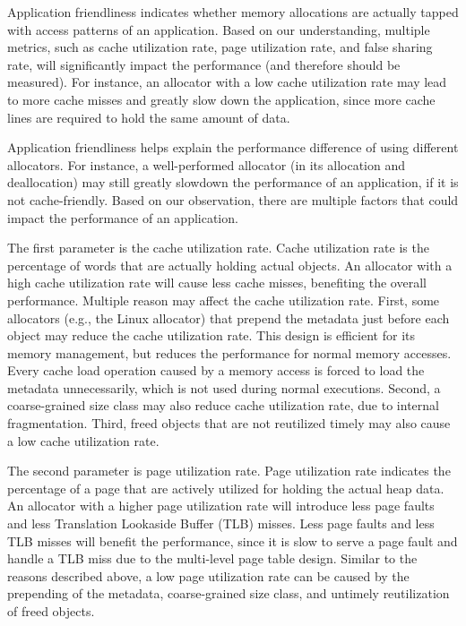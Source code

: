 Application friendliness indicates whether memory allocations are actually tapped with access patterns of an application. Based on our understanding, multiple metrics, such as cache utilization rate, page utilization rate, and false sharing rate, will significantly impact the performance (and therefore should be measured). For instance, an allocator with a low cache utilization rate may lead to more cache misses and greatly slow down the application, since more cache lines are required to hold the same amount of data. 

Application friendliness helps explain the performance difference of using different allocators. For instance, a well-performed allocator (in its allocation and deallocation) may still greatly slowdown the performance of an application, if it is not cache-friendly. Based on our observation, there are multiple factors that could impact the performance of an application.

The first parameter is the cache utilization rate. Cache utilization rate is the percentage of words that are actually holding actual objects. An allocator with a high cache utilization rate will cause less cache misses, benefiting the overall performance. Multiple reason may affect the cache utilization rate. First, some allocators (e.g., the Linux allocator) that  prepend the metadata just before each object may reduce the cache utilization rate. This design is efficient for its memory management, but reduces the performance for normal memory accesses. Every cache load operation caused by a memory access is forced to load the metadata unnecessarily, which is not used during normal executions. 
 Second, a coarse-grained size class may also reduce cache utilization rate, due to internal fragmentation. Third, freed objects that are not reutilized timely may also cause a low cache utilization rate. 


The second parameter is page utilization rate. Page utilization rate indicates the percentage of a page that are actively utilized for holding the actual heap data. An allocator with a higher page utilization rate will introduce less page faults and less Translation Lookaside Buffer (TLB) misses. Less page faults and less TLB misses will benefit the performance, since it is  slow to serve a page fault and handle a TLB miss due to the multi-level page table design. Similar to the reasons described above, a low page utilization rate can be caused by the prepending of the metadata, coarse-grained size class, and untimely reutilization of freed objects. 

